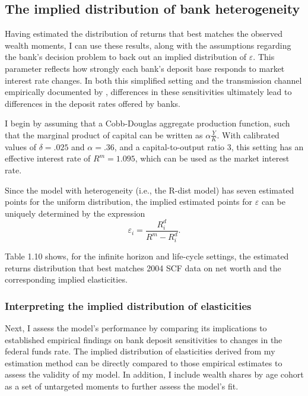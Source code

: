  \subsection{The implied distribution of bank heterogeneity}

  \par Having estimated the distribution of returns that best matches the observed wealth moments, I can use these results, along with the assumptions regarding the bank's decision problem to back out an implied distribution of $\varepsilon$. This parameter reflects how strongly each bank’s deposit base responds to market interest rate changes. In both this simplified setting and the transmission channel empirically documented by \cite{Drechsler2017}, differences in these sensitivities ultimately lead to differences in the deposit rates offered by banks.  

  \par I begin by assuming that a Cobb-Douglas aggregate production function, such that the marginal product of capital can be written as $\alpha \frac{Y}{K}$. With calibrated values of $\delta = .025$ and $\alpha = .36$, and a capital-to-output ratio $3$, this setting has an effective interest rate of $R^m = 1.095$, which can be used as the market interest rate.

  \par Since the model with heterogeneity (i.e., the R-dist model) has seven estimated points for the uniform distribution, the implied estimated points for $\varepsilon$ can be uniquely determined by the expression $$\varepsilon_i = \frac{R_i^d}{R^m - R_i^d} .$$

  \par Table 1.10 shows, for the infinite horizon and life-cycle settings, the estimated returns distribution that best matches 2004 SCF data on net worth and the corresponding implied elasticities. 

   

  \subsubsection{Interpreting the implied distribution of elasticities}

    \par Next, I assess the model's performance by comparing its implications to established empirical findings on bank deposit sensitivities to changes in the federal funds rate. The implied distribution of elasticities derived from my estimation method can be directly compared to those empirical estimates to assess the validity of my model. In addition, I include wealth shares by age cohort as a set of untargeted moments to further assess the model's fit.  


